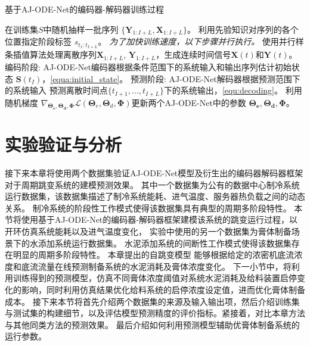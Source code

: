 \begin{algorithm*}[]
\caption{ 基于AJ-ODE-Net的编码器-解码器训练过程 }
\label{alg:training}
\begin{algorithmic}[1]
\State  在训练集$S$中随机抽样一批序列 $\{\boldsymbol{Y}_{1:I+L}, {\boldsymbol {X}}_{1:I+L}\}$。
\State 利用先验知识对序列的各个位置指定阶段标签 $s_{t_1:t_{I+L}}$。
\State \text{//}\textit{为了加快训练速度，以下步骤并行执行。}
\State 使用并行样条插值算法处理离散序列${\boldsymbol {X}}_{1:I+L}$, $\boldsymbol{Y}_{1:I+L}$，生成连续时间信号$\boldsymbol X(t)$和$\boldsymbol Y(t)$。
\State 编码阶段: AJ-ODE-Net编码器根据条件范围下的系统输入和输出序列估计初始状态 $\boldsymbol{S}\left(t_{I}\right)$，\eqref{equa:initial_state}。
\State 预测阶段: AJ-ODE-Net解码器根据预测范围下的系统输入 预测离散时间点$\{t_{I+1}, \dots, t_{I+L}\}$下的系统输出，\eqref{equ:decoding}。
\State 利用随机梯度 $\nabla_{\boldsymbol{\Theta_{e}}, \boldsymbol{\Theta_{d}}, \boldsymbol \Phi}\mathcal{L}\left(\boldsymbol{\Theta}_{e}, \boldsymbol{\Theta}_{d}, \boldsymbol{\Phi}\right)$更新两个AJ-ODE-Net中的参数 $\boldsymbol{\Theta_{e}}, \boldsymbol{\Theta_{d}}, \boldsymbol \Phi$。
\EndFor
\EndFor
\end{algorithmic}
\end{algorithm*}


\section{实验验证与分析}
\label{sec:4_evalutaion}
接下来本章将使用两个数据集验证AJ-ODE-Net模型及衍生出的编码器解码器框架对于周期跳变系统的建模预测效果。
其中一个数据集为公有的数据中心制冷系统运行数据集，该数据集描述了制冷系统能耗、进气温度、服务器热负载之间的动态关系。
制冷系统的阶段性工作模式使得该数据集具有典型的周期多阶段特性。
本节将使用基于AJ-ODE-Net的编码器-解码器框架建模该系统的跳变运行过程，以开环仿真系统能耗以及进气温度变化，
实验中使用的另一个数据集为膏体制备场景下的水添加系统运行数据集。
水泥添加系统的间断性工作模式使得该数据集存在明显的周期多阶段特性。
本章提出的自跳变模型
能够根据给定的浓密机底流浓度和底流流量在线预测制备系统的水泥消耗及膏体浓度变化。
下一小节中，将利用训练得到的预测模型，仿真不同膏体浓度阈值对系统水泥消耗及给料装置启停变化的影响，同时利用仿真结果优化给料系统的启停浓度设定值，进而优化膏体制备成本。
接下来本节将首先介绍两个数据集的来源及输入输出项，然后介绍训练集与测试集的构建细节，以及评估模型预测精度的评价指标。紧接着，对比本章方法与其他同类方法的预测效果。
最后介绍如何利用预测模型辅助优膏体制备系统的运行参数。


